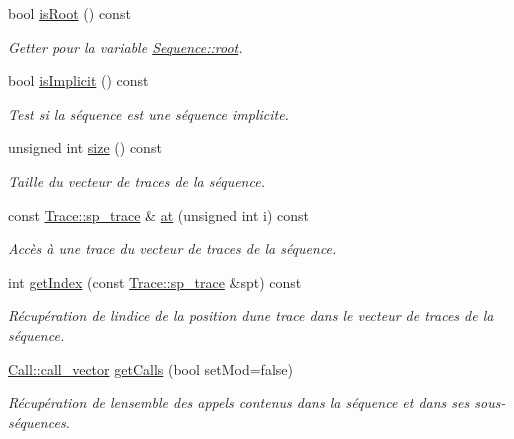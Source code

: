 \begin{DoxyCompactItemize}
bool \hyperlink{class_sequence_a231764f7959252b2c95e7658c5c1fd19}{is\+Root} () const 
\begin{DoxyCompactList}\small\item\em Getter pour la variable \hyperlink{class_sequence_ac09da762e43cc657842d4f953ffff613}{Sequence\+::root}. \end{DoxyCompactList}\item 
bool \hyperlink{class_sequence_a0eee9fda2394b83b440911f4fc888b60}{is\+Implicit} () const 
\begin{DoxyCompactList}\small\item\em Test si la séquence est une séquence implicite. \end{DoxyCompactList}\item 
unsigned int \hyperlink{class_sequence_a40b394b58ce0a47d2e265f098eb8edca}{size} () const 
\begin{DoxyCompactList}\small\item\em Taille du vecteur de traces de la séquence. \end{DoxyCompactList}\item 
const \hyperlink{class_trace_a9c58e523529fc8a03fb6acf3eef86150}{Trace\+::sp\+\_\+trace} \& \hyperlink{class_sequence_a65030d6b4be29f3747f646d2b246c05c}{at} (unsigned int i) const 
\begin{DoxyCompactList}\small\item\em Accès à une trace du vecteur de traces de la séquence. \end{DoxyCompactList}\item 
int \hyperlink{class_sequence_ac312884c78445acddcdb9d96a6a3b4b7}{get\+Index} (const \hyperlink{class_trace_a9c58e523529fc8a03fb6acf3eef86150}{Trace\+::sp\+\_\+trace} \&spt) const 
\begin{DoxyCompactList}\small\item\em Récupération de l\textquotesingle{}indice de la position d\textquotesingle{}une trace dans le vecteur de traces de la séquence. \end{DoxyCompactList}\item 
\hyperlink{class_call_aa446a4316c03fb722ab10d0e1da33643}{Call\+::call\+\_\+vector} \hyperlink{class_sequence_ae19d30e099accaf9dd07b21d434c67e2}{get\+Calls} (bool set\+Mod=false)
\begin{DoxyCompactList}\small\item\em Récupération de l\textquotesingle{}ensemble des appels contenus dans la séquence et dans ses sous-\/séquences. \end{DoxyCompactList}\item 

\end{DoxyCompactItemize}
